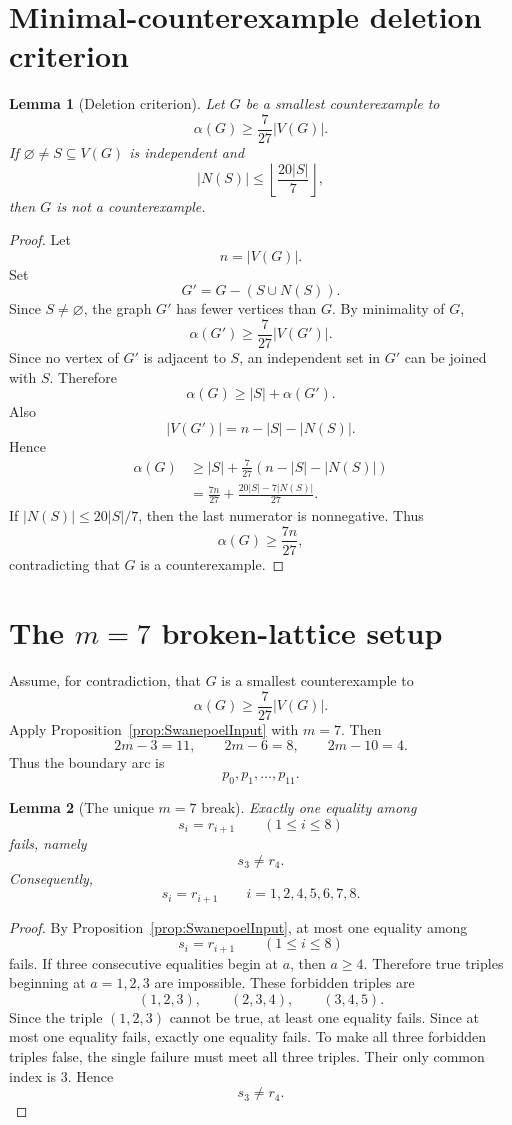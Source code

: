 \documentclass[11pt]{article}
\theoremstyle{plain}
\newtheorem{lemma}{Lemma}
\numberwithin{equation}{section}
\begin{document}
\section{Minimal-counterexample deletion criterion}

\begin{lemma}[Deletion criterion]\label{lem:deletion}
Let $G$ be a smallest counterexample to
\[
 \alpha(G)\ge \frac{7}{27}|V(G)|.
\]
If $\varnothing\ne S\subseteq V(G)$ is independent and
\[
 |N(S)|\le \left\lfloor\frac{20|S|}{7}\right\rfloor,
\]
then $G$ is not a counterexample.
\end{lemma}

\begin{proof}
Let
\[
 n=|V(G)|.
\]
Set
\[
 G'=G-(S\cup N(S)).
\]
Since $S\ne\varnothing$, the graph $G'$ has fewer vertices than $G$. By minimality of $G$,
\[
 \alpha(G')\ge \frac{7}{27}|V(G')|.
\]
Since no vertex of $G'$ is adjacent to $S$, an independent set in $G'$ can be joined with $S$. Therefore
\[
 \alpha(G)\ge |S|+\alpha(G').
\]
Also
\[
 |V(G')|=n-|S|-|N(S)|.
\]
Hence
\[
\begin{aligned}
 \alpha(G)
 &\ge |S|+\frac{7}{27}(n-|S|-|N(S)|)\\
 &=\frac{7n}{27}+\frac{20|S|-7|N(S)|}{27}.
\end{aligned}
\]
If $|N(S)|\le 20|S|/7$, then the last numerator is nonnegative. Thus
\[
 \alpha(G)\ge \frac{7n}{27},
\]
contradicting that $G$ is a counterexample.
\end{proof}

\section{The \texorpdfstring{$m=7$}{m=7} broken-lattice setup}

Assume, for contradiction, that $G$ is a smallest counterexample to
\[
 \alpha(G)\ge \frac{7}{27}|V(G)|.
\]
Apply Proposition~\ref{prop:SwanepoelInput} with $m=7$. Then
\[
 2m-3=11,
 \qquad
 2m-6=8,
 \qquad
 2m-10=4.
\]
Thus the boundary arc is
\[
 p_0,p_1,\ldots,p_{11}.
\]

\begin{lemma}[The unique $m=7$ break]\label{lem:unique-break}
Exactly one equality among
\[
 s_i=r_{i+1}\qquad(1\le i\le 8)
\]
fails, namely
\[
 s_3\ne r_4.
\]
Consequently,
\[
 s_i=r_{i+1}\qquad i=1,2,4,5,6,7,8.
\]
\end{lemma}

\begin{proof}
By Proposition~\ref{prop:SwanepoelInput}, at most one equality among
\[
 s_i=r_{i+1}\qquad(1\le i\le 8)
\]
fails. If three consecutive equalities begin at $a$, then $a\ge4$.
Therefore true triples beginning at $a=1,2,3$ are impossible. These forbidden triples are
\[
 (1,2,3),\qquad (2,3,4),\qquad (3,4,5).
\]
Since the triple $(1,2,3)$ cannot be true, at least one equality fails. Since at most one equality fails, exactly one equality fails. To make all three forbidden triples false, the single failure must meet all three triples. Their only common index is $3$. Hence
\[
 s_3\ne r_4.
\]
\end{proof}
\end{document}
